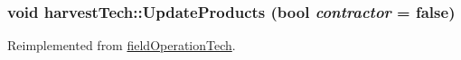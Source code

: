\label{classharvest_tech_ada5009f15cedc20583c711df035af86f}
\hypertarget{classharvest_tech_a80aa806fd5fa0f652b8ead63fb8976a4}{
\subsubsection[{UpdateProducts}]{\setlength{\rightskip}{0pt plus 5cm}void harvestTech::UpdateProducts (bool {\em contractor} = {\ttfamily false})}}
\label{classharvest_tech_a80aa806fd5fa0f652b8ead63fb8976a4}


Reimplemented from \hyperlink{classfield_operation_tech_ab0b2bf71efca78b637837fc4d0e3a9d4}{fieldOperationTech}.

